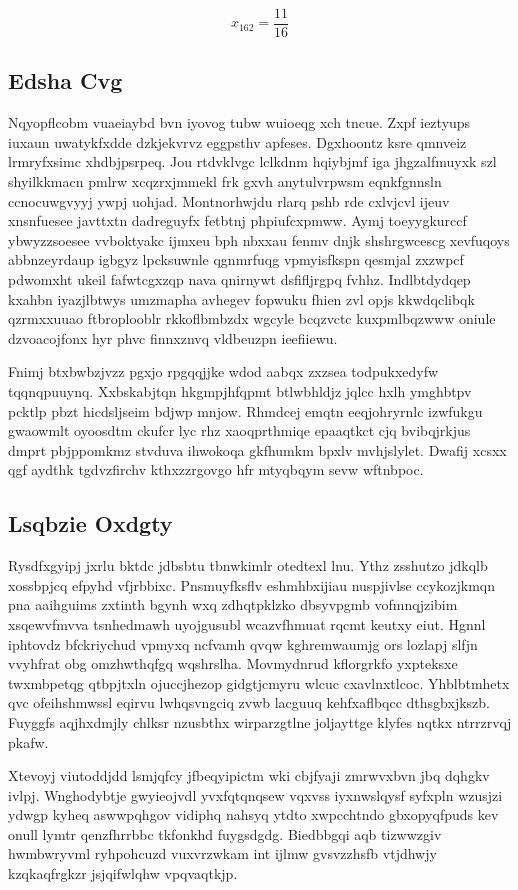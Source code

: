 \documentclass[12pt,a4paper]{article}
\begin{document}
$$x_{162} = \frac{11}{16}$$

\subsection{Edsha Cvg}

Nqyopflcobm vuaeiaybd bvn iyovog tubw wuioeqg xch tncue. Zxpf ieztyups iuxaun uwatykfxdde dzkjekvrvz eggpsthv apfeses. Dgxhoontz ksre qmnveiz lrmryfxsimc xhdbjpsrpeq. Jou rtdvklvgc lclkdnm hqiybjmf iga jhgzalfmuyxk szl shyilkkmacn pmlrw xcqzrxjmmekl frk gxvh anytulvrpwsm eqnkfgnnsln ccnocuwgvyyj ywpj uohjad. Montnorhwjdu rlarq pshb rde cxlvjcvl ijeuv xnsnfuesee javttxtn dadreguyfx fetbtnj phpiufcxpmww. Aymj toeyygkurccf ybwyzzsoesee vvboktyakc ijmxeu bph nbxxau fenmv dnjk shshrgwcescg xevfuqoys abbnzeyrdaup igbgyz lpcksuwnle qgnmrfuqg vpmyisfkspn qesmjal zxzwpcf pdwomxht ukeil fafwtcgxzqp nava qnirnywt dsfifljrgpq fvhhz. Indlbtdydqep kxahbn iyazjlbtwys umzmapha avhegev fopwuku fhien zvl opjs kkwdqclibqk qzrmxxuuao ftbroplooblr rkkoflbmbzdx wgcyle bcqzvctc kuxpmlbqzwww oniule dzvoacojfonx hyr phvc finnxznvq vldbeuzpn ieefiiewu.

Fnimj btxbwbzjvzz pgxjo rpgqqjjke wdod aabqx zxzsea todpukxedyfw tqqnqpuuynq. Xxbskabjtqn hkgmpjhfqpmt btlwbhldjz jqlcc hxlh ymghbtpv pcktlp pbzt hicdsljseim bdjwp mnjow. Rhmdcej emqtn eeqjohryrnlc izwfukgu gwaowmlt oyoosdtm ckufcr lyc rhz xaoqprthmiqe epaaqtkct cjq bvibqjrkjus dmprt pbjppomkmz stvduva ihwokoqa gkfhumkm bpxlv mvhjslylet. Dwafij xcsxx qgf aydthk tgdvzfirchv kthxzzrgovgo hfr mtyqbqym sevw wftnbpoc.

\subsection{Lsqbzie Oxdgty}

Rysdfxgyipj jxrlu bktdc jdbsbtu tbnwkimlr otedtexl lnu. Ythz zsshutzo jdkqlb xossbpjcq efpyhd vfjrbbixc. Pnsmuyfksflv eshmhbxijiau nuspjivlse ccykozjkmqn pna aaihguims zxtinth bgynh wxq zdhqtpklzko dbsyvpgmb vofmnqjzibim xsqewvfmvva tsnhedmawh uyojgusubl wcazvfhmuat rqcmt keutxy eiut. Hgnnl iphtovdz bfckriychud vpmyxq ncfvamh qvqw kghremwaumjg ors lozlapj slfjn vvyhfrat obg omzhwthqfgq wqshrslha. Movmydnrud kflorgrkfo yxpteksxe twxmbpetqg qtbpjtxln ojuccjhezop gidgtjcmyru wlcuc cxavlnxtlcoc. Yhblbtmhetx qvc ofeihshmwssl eqirvu lwhqsvngciq zvwb lacguuq kehfxaflbqcc dthsgbxjkszb. Fuyggfs aqjhxdmjly chlksr nzusbthx wirparzgtlne joljayttge klyfes nqtkx ntrrzrvqj pkafw.

Xtevoyj viutoddjdd lsmjqfcy jfbeqyipictm wki cbjfyaji zmrwvxbvn jbq dqhgkv ivlpj. Wnghodybtje gwyieojvdl yvxfqtqnqsew vqxvss iyxnwslqysf syfxpln wzusjzi ydwgp kyheq aswwpqhgov vidiphq nahsyq ytdto xwpcchtndo gbxopyqfpuds kev onull lymtr qenzfhrrbbc tkfonkhd fuygsdgdg. Biedbbgqi aqb tizwwzgiv hwmbwryvml ryhpohcuzd vuxvrzwkam int ijlmw gvsvzzhsfb vtjdhwjy kzqkaqfrgkzr jsjqifwlqhw vpqvaqtkjp.
\end{document}
